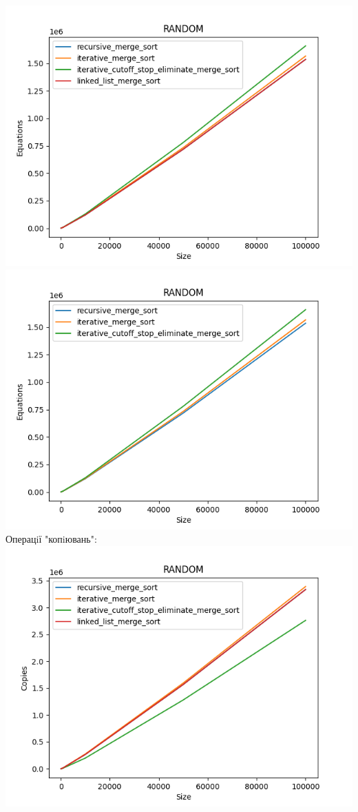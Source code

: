 \documentclass{article}
\begin{document}
        \includegraphics[scale=0.5]{random_Equations_4_sorts_6_numbers_50_100to100000.png}
        \includegraphics[scale=0.5]{random_Equations_3_sorts_6_numbers_50_100to100000.png}
    \newpage
    Операцiї "копiювань":
    \newline
        \includegraphics[scale=0.5]{random_Copies_4_sorts_6_numbers_50_100to100000.png}
\end{document}
